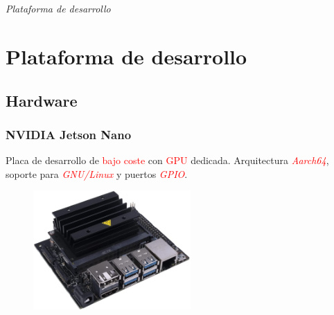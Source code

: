 \documentclass{beamer}
\begin{document}

\section*{}
\begin{frame}{}
	\centering \Huge
	\emph{Plataforma de desarrollo}
\end{frame}

\section{Plataforma de desarrollo}
\subsection{Hardware}
\begin{frame}
	\frametitle{NVIDIA Jetson Nano}
	\begin{outline}
		\1 Placa de desarrollo de \textcolor{red}{bajo coste} con \textcolor{red}{GPU} dedicada.
		\1 Arquitectura \textcolor{red}{\textit{Aarch64}}, soporte para \textcolor{red}{\textit{GNU/Linux}} y puertos \textcolor{red}{\textit{GPIO}}.
	\end{outline}
	\begin{figure}
		\centering
		\includegraphics[width=6cm]{figs/jetsonnano}
	\end{figure}
\end{frame}
\end{document}

